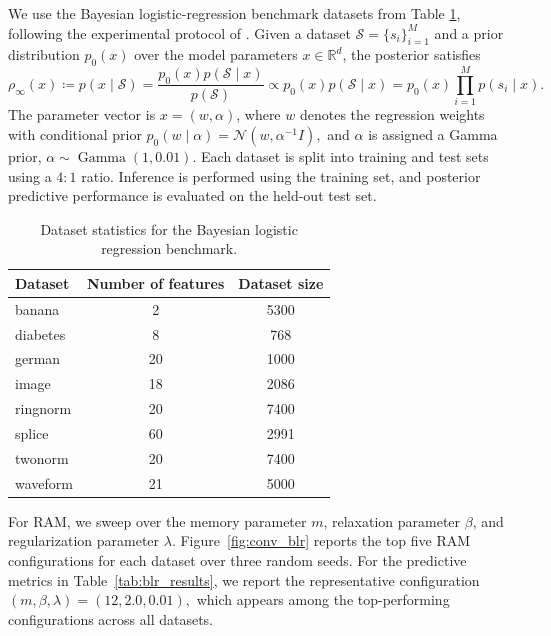 \documentclass{article} %
\numberwithin{equation}{subsection}
\numberwithin{theorem}{section}
\begin{document}
  We use the Bayesian logistic-regression benchmark datasets from
\cite{mika_fisher_1999} Table \ref{tab:blr_dataset_stats}, following the experimental protocol of
\cite{fan_variational_2022,mokrov_large-scale_2021}.
Given a dataset \(\mathcal{S}=\{s_i\}_{i=1}^M\) and a prior distribution \(p_0(x)\) over the
model parameters \(x\in\mathbb{R}^d\), the posterior satisfies
\[
    \rho_\infty(x) \coloneqq 
    p(x\mid \mathcal{S})
    =
    \frac{p_0(x)p(\mathcal{S}\mid x)}{p(\mathcal{S})}
    \propto
    p_0(x)p(\mathcal{S}\mid x)
    =
    p_0(x)\prod_{i=1}^M p(s_i\mid x).
\]
The parameter vector
is \(x=(w,\alpha)\), where \(w\) denotes the regression weights with conditional
prior $p_0(w\mid \alpha)=\mathcal{N}(w,\alpha^{-1}I),$
and \(\alpha\) is assigned a Gamma prior, $\alpha \sim \operatorname{Gamma}(1,0.01).$ Each dataset is split into
training and test sets using a \(4{:}1\) ratio. Inference is performed using the
training set, and posterior predictive performance is evaluated on the held-out
test set.

\begin{table}[t]
\centering
\caption{
Dataset statistics for the Bayesian logistic regression benchmark.
}
\label{tab:blr_dataset_stats}
\begin{tabular}{lcc}
\toprule
Dataset & Number of features & Dataset size \\
\midrule
banana   & 2  & 5300 \\
diabetes & 8  & 768 \\
german   & 20 & 1000 \\
image    & 18 & 2086 \\
ringnorm & 20 & 7400 \\
splice   & 60 & 2991 \\
twonorm  & 20 & 7400 \\
waveform & 21 & 5000 \\
\bottomrule
\end{tabular}
\end{table}

For RAM, we sweep over the memory parameter \(m\), relaxation parameter
\(\beta\), and regularization parameter \(\lambda\). Figure~\ref{fig:conv_blr}
reports the top five RAM configurations for each dataset over three random seeds. For the predictive metrics in
Table~\ref{tab:blr_results}, we report the representative configuration $    (m,\beta,\lambda)=(12,2.0,0.01),$ which appears among the top-performing configurations across all datasets.
\end{document}
